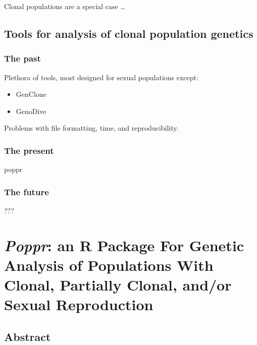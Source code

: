 \documentclass[double,12pt]{beavtex}
\providecommand{\tightlist}{%
  \setlength{\itemsep}{0pt}\setlength{\parskip}{0pt}}
\begin{document}
  Clonal populations are a special case \ldots{}
  
  \section{Tools for analysis of clonal population
  genetics}\label{tools-for-analysis-of-clonal-population-genetics}
  
  \subsection{The past}\label{the-past}
  
  Plethora of tools, most designed for sexual populations except:
  
  \begin{itemize}
  \tightlist
  \item
    GenClone
  \item
    GenoDive
  \end{itemize}
  
  Problems with file formatting, time, and reproducibility.
  
  \subsection{The present}\label{the-present}
  
  poppr
  
  \subsection{The future}\label{the-future}
  
  ???
  
  \chapter{\texorpdfstring{\emph{Poppr}: an R Package For Genetic Analysis
  of Populations With Clonal, Partially Clonal, and/or Sexual
  Reproduction}{Poppr: an R Package For Genetic Analysis of Populations With Clonal, Partially Clonal, and/or Sexual Reproduction}}\label{poppr-an-r-package-for-genetic-analysis-of-populations-with-clonal-partially-clonal-andor-sexual-reproduction}
  
  \section{Abstract}\label{abstract}
  
\end{document}

